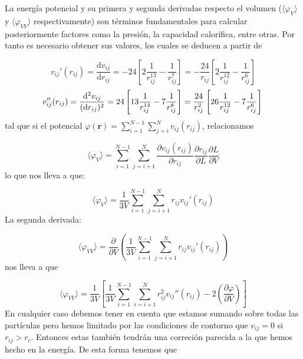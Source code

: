 \documentclass[11pt]{article}
\newcommand{\rn}{\mathbf{r}}
\newcommand{\parentesis}[1]{\left( #1  \right)}
\newcommand{\parciales}[2]{\frac{\partial #1}{\partial #2}}
\newcommand{\ccorchetes}[1]{\left[ #1  \right]}
\newcommand{\D}{\mathrm{d}}
\newcommand{\derivadas}[2]{\frac{\D #1}{\D #2}}
\begin{document}
La energía potencial y su primera y segunda derivadas respecto el volumen ($\langle \varphi_V \rangle$ y $\langle \varphi_{VV} \rangle$ respectivamente) son términos fundamentales para calcular posteriormente factores como la presión, la capacidad calorífica, entre otras. Por tanto es necesario obtener sus valores, los cuales se deducen a partir de 

\begin{equation}
	v_{ij}' (r_{ij}) = \derivadas{v_{ij}}{r_{ij}} = -24 \ccorchetes{2\frac{1}{r_{ij}^{13}}- \frac{1}{r_{ij}^7}} = -\frac{24}{r_{ij}} \ccorchetes{2\frac{1}{r_{ij}^{12}} - \frac{1}{r_{ij}^6}} 
\end{equation}	
\begin{equation}
	v_{ij}''(r_{ij}) = \frac{\D^2v_{ij}}{(\D r_{ij})^2} = 24 \ccorchetes{13\frac{1}{r_{ij}^{14}}- 7\frac{1}{r_{ij}^8}} = \frac{24}{r_{ij}^2} \ccorchetes{26\frac{1}{r_{ij}^{12}}- 7\frac{1}{r_{ij}^6}} \\ 
\end{equation}
tal que si el potencial $\varphi(\rn) = \sum_{i=1}^{N-1} \sum_{j=i}^N v_{ij} (r_{ij})$, relacionamos 


\begin{equation}
	\langle \varphi_V \rangle = \sum_{i=1}^{N-1}\sum_{j=i+1}^{N} \parciales{v_{ij} (r_{ij})}{r_{ij}} \parciales{r_{ij}}{L} \parciales{L}{V}
\end{equation}
lo que nos lleva a que:

\begin{equation}
	\langle \varphi_V \rangle = \frac{1}{3V} \sum_{i=1}^{N-1}\sum_{j=i+1}^{N}  r_{ij} v_{ij}'(r_{ij})
\end{equation}
La segunda derivada:


\begin{equation}
	\langle \varphi_{VV} \rangle =\parciales{}{V} \parentesis{\frac{1}{3V} \sum_{i=1}^{N-1}\sum_{j=i+1}^{N}  r_{ij} v_{ij}'(r_{ij})}
\end{equation}
nos lleva a que

\begin{equation}
	\langle \varphi_{VV} \rangle = \frac{1}{3V} \ccorchetes{\frac{1}{3V} \sum_{i=1}^{N-1} \sum_{i=i+1}^{N} r_{ij}^2 v_{ij}''(r_{ij})	- 2 \parentesis{\parciales{\varphi}{V}}}
\end{equation}
En cualquier caso debemos tener en cuenta que estamos sumando sobre todas las partículas pero hemos limitado por las condiciones de contorno que $v_{ij}=0$ si $r_{ij}>r_c$. Entonces estas también tendrán una correción parecida a la que hemos hecho en la energía. De esta forma tenemos que 
\end{document}
